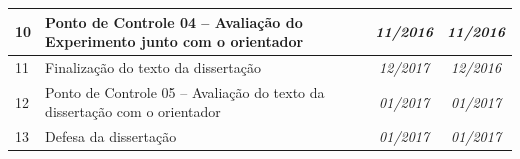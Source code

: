 \documentclass[msc,proposal,hidelot,hideabstract]{ppgccufmg} %
\begin{document}
\begin{table}[]
{\begin{tabular}{|l|l|c|c|}
			10 & Ponto de Controle 04 – Avaliação do Experimento junto com o orientador                & \textit{11/2016}                   & \textit{11/2016}                    \\ \hline
			11 & Finalização do texto da dissertação                                                   & \textit{12/2017}                   & \textit{12/2016}                    \\ \hline
			12 & Ponto de Controle 05 – Avaliação do texto da dissertação com o orientador             & \textit{01/2017}                   & \textit{01/2017}                    \\ \hline
			13 & Defesa da dissertação                                                                 & \textit{01/2017}                   & \textit{01/2017}                    \\ \hline
		\end{tabular}%
	}
\end{table}
\end{document}
